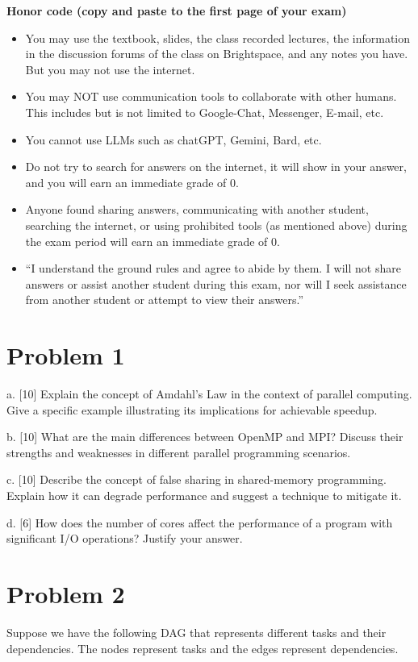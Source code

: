 \documentclass{article}
\begin{document}
\hrulefill

\textbf{Honor code (copy and paste to the first page of your exam)}

\begin{itemize}
    \item You may use the textbook, slides, the class recorded lectures, the information in the discussion forums of the class on Brightspace, and any notes you have. But you may not use the internet.
    \item You may NOT use communication tools to collaborate with other humans. This includes but is not limited to Google-Chat, Messenger, E-mail, etc.
    \item You cannot use LLMs such as chatGPT, Gemini, Bard, etc.
    \item Do not try to search for answers on the internet, it will show in your answer, and you will earn an immediate grade of 0.
    \item Anyone found sharing answers, communicating with another student, searching the internet, or using prohibited tools (as mentioned above) during the exam period will earn an immediate grade of 0.
    \item ``I understand the ground rules and agree to abide by them. I will not share answers or assist another student during this exam, nor will I seek assistance from another student or attempt to view their answers.''
\end{itemize}

\hrulefill

\section*{Problem 1}
a. [10]  Explain the concept of Amdahl's Law in the context of parallel computing.  Give a specific example illustrating its implications for achievable speedup.

b. [10] What are the main differences between OpenMP and MPI?  Discuss their strengths and weaknesses in different parallel programming scenarios.

c. [10] Describe the concept of false sharing in shared-memory programming. Explain how it can degrade performance and suggest a technique to mitigate it.

d. [6]  How does the number of cores affect the performance of a program with significant I/O operations? Justify your answer.


\section*{Problem 2}
Suppose we have the following DAG that represents different tasks and their dependencies.  The nodes represent tasks and the edges represent dependencies.
\end{document}
